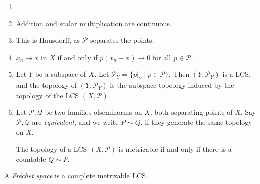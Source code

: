 \documentclass[12pt]{article}
\begin{document}
\begin{remark}
	\begin{enumerate}[1.]
		\item[]
		\item Addition and scalar multiplication are continuous.
		\item This is Hausdorff, as $\mathcal{P}$ separates the points.
		\item $x_n \to x$ in $X$ if and only if $p(x_n - x) \to 0$ for all $p \in \mathcal{P}$.
		\item Let $Y$ be a subspace of $X$. Let $\mathcal{P}_Y = \{p|_Y \mid p \in \mathcal{P}\}$. Then $(Y, \mathcal{P}_Y)$ is a LCS, and the topology of $(Y, \mathcal{P}_Y)$ is the subspace topology induced by the topology of the LCS $(X, \mathcal{P})$.
		\item Let $\mathcal{P}, \mathcal{Q}$ be two families ofseminorms on $X$, both separating points of $X$. Say $\mathcal{P}, \mathcal{Q}$ are \emph{equivalent}, and we write $P \sim Q$, if they generate the same topology on $X$.

			The topology of a LCS $(X, \mathcal{P})$ is metrizable if and only if there is a countable $Q \sim P$.
	\end{enumerate}
\end{remark}

\begin{definition}
	A \emph{Fr\'echet space} is a complete metrizable LCS.
\end{definition}
\end{document}
